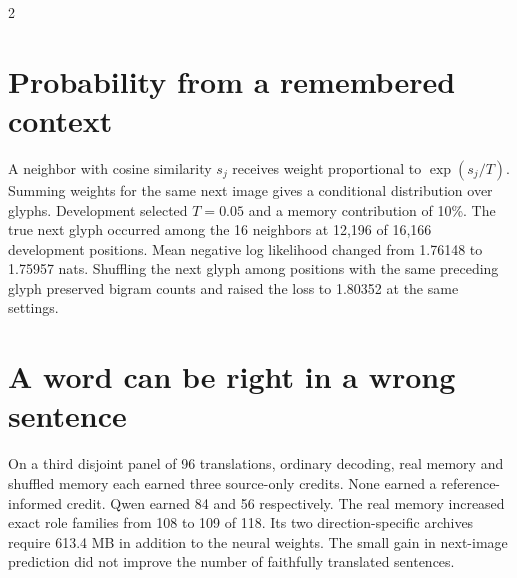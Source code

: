 \begin{multicols}{2}
\section*{Probability from a remembered context}
A neighbor with cosine similarity $s_j$ receives weight proportional to $\exp(s_j/T)$. Summing weights for the same next image gives a conditional distribution over glyphs. Development selected $T=0.05$ and a memory contribution of 10\%. The true next glyph occurred among the 16 neighbors at 12,196 of 16,166 development positions. Mean negative log likelihood changed from 1.76148 to 1.75957 nats. Shuffling the next glyph among positions with the same preceding glyph preserved bigram counts and raised the loss to 1.80352 at the same settings.
\section*{A word can be right in a wrong sentence}
On a third disjoint panel of 96 translations, ordinary decoding, real memory and shuffled memory each earned three source-only credits. None earned a reference-informed credit. Qwen earned 84 and 56 respectively. The real memory increased exact role families from 108 to 109 of 118. Its two direction-specific archives require 613.4 MB in addition to the neural weights. The small gain in next-image prediction did not improve the number of faithfully translated sentences.
\end{multicols}
\par\smallskip
{}\par\smallskip
{}\par\medskip

